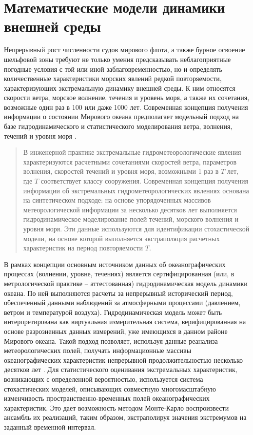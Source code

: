 \section{Математические модели динамики внешней среды}

Непрерывный рост численности судов мирового флота, а также бурное освоение шельфовой зоны требуют не только умения предсказывать неблагоприятные погодные условия с той или иной заблаговременностью, но и определять количественные характеристики морских явлений редкой повторяемости, характеризующих экстремальную динамику внешней среды. К ним относятся скорости ветра, морское волнение, течения и уровень моря, а также их сочетания, возможные один раз в 100 или даже 1000 лет. Современная концепция получения информации о состоянии Мирового океана предполагает модельный подход на базе гидродинамического и статистического моделирования ветра, волнения, течений и уровня моря \citep{dk2}.

\begin{quote}
В инженерной практике экстремальные гидрометеорологические явления характеризуются расчетными сочетаниями скоростей ветра, параметров волнения, скоростей течений и уровня моря, возможными 1 раз в $T$ лет, где $T$ соответствует классу сооружения. Современная концепция получения информации об экстремальных гидрометеорологических явлениях основана на синтетическом подходе: на основе упорядоченных массивов метеорологической информации за несколько десятков лет выполняется гидродинамическое моделирование полей течений, морского волнения и уровня моря. Эти данные используются для идентификации стохастической модели, на основе которой выполняется экстраполяция расчетных характеристик на период повторяемости $T$. 
\end{quote}

В рамках концепции \citep{dk3} основным источником данных об океанографических процессах (волнении, уровне, течениях) является сертифицированная (или, в метрологической практике – аттестованная) гидродинамическая модель динамики океана. По ней выполняются расчеты за непрерывный исторический период, обеспеченный данными наблюдений за атмосферными процессами (давлением, ветром и температурой воздуха). Гидродинамическая модель может быть интерпретирована как виртуальная измерительная система, верифицированная на основе разрозненных данных измерений, уже имеющихся в данном районе Мирового океана. Такой подход позволяет, используя данные реанализа метеорологических полей, получать информационные массивы океанографических характеристик непрерывной продолжительностью несколько десятков лет \citep{dk4}. Для статистического оценивания экстремальных характеристик, возникающих с определенной вероятностью, используется система стохастических моделей, описывающих совместную многомасштабную изменчивость пространственно-временных полей океанографических характеристик. Это дает возможность методом Монте-Карло воспроизвести ансамбль их реализаций, таким образом, экстраполируя значения экстремумов на заданный временной интервал.

